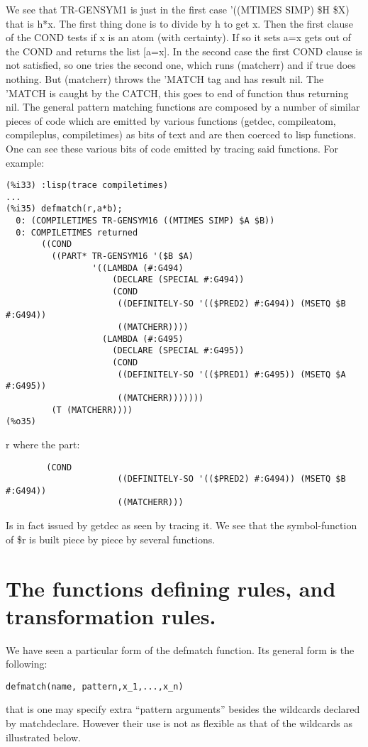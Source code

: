 \documentclass[a4paper,11pt]{article}
\begin{document}
We see that TR-GENSYM1 is just in the first case 
'((MTIMES SIMP) \$H \$X) that is h*x. The first thing done is to divide by
h to get x. Then the first clause of the COND tests if x is an atom (with
certainty). If so it sets a=x gets out of the COND and returns the list
[a=x]. In the second case the first COND clause is not satisfied, so one tries
the second one, which runs (matcherr) and if true does nothing. But (matcherr)
throws the 'MATCH tag and has result nil. The 'MATCH is caught by the CATCH,
this goes to end of function thus returning nil. The general pattern matching
functions are composed by a number of similar pieces of code which are emitted 
by various functions (getdec, compileatom, compileplus, compiletimes) as bits of text
and are then coerced to lisp functions. One can see these various bits of code emitted by
tracing said functions. For example:
\begin{verbatim}
(%i33) :lisp(trace compiletimes)
...
(%i35) defmatch(r,a*b);
  0: (COMPILETIMES TR-GENSYM16 ((MTIMES SIMP) $A $B))
  0: COMPILETIMES returned
       ((COND
         ((PART* TR-GENSYM16 '($B $A)
                 '((LAMBDA (#:G494)
                     (DECLARE (SPECIAL #:G494))
                     (COND
                      ((DEFINITELY-SO '(($PRED2) #:G494)) (MSETQ $B #:G494))
                      ((MATCHERR))))
                   (LAMBDA (#:G495)
                     (DECLARE (SPECIAL #:G495))
                     (COND
                      ((DEFINITELY-SO '(($PRED1) #:G495)) (MSETQ $A #:G495))
                      ((MATCHERR)))))))
         (T (MATCHERR))))
(%o35) 
\end{verbatim}                                r
where the part:
\begin{verbatim}
   	    (COND
                      ((DEFINITELY-SO '(($PRED2) #:G494)) (MSETQ $B #:G494))
                      ((MATCHERR)))
\end{verbatim}
Is in fact issued by getdec as seen by tracing it. We see that the symbol-function
of \$r is built piece by piece by several functions.


\section{The functions defining rules, and transformation rules.}


We have seen a particular form of the defmatch function.  Its general
form is the following:

\begin{verbatim}
defmatch(name, pattern,x_1,...,x_n) 
\end{verbatim}
that is one may specify extra ``pattern arguments'' besides the
wildcards declared by matchdeclare. However their use is not as
flexible as that of the wildcards as illustrated below.
\end{document}
